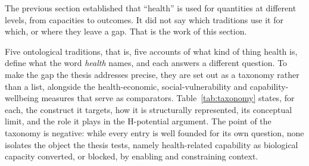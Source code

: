 The previous section established that ``health'' is used for quantities at different levels, from capacities to outcomes. It did not say which traditions use it for which, or where they leave a gap. That is the work of this section.

Five ontological traditions, that is, five accounts of what kind of thing health is, define what the word \emph{health} names, and each answers
a different question. To make the gap the thesis addresses precise, they are set out as
a taxonomy rather than a list, alongside the health-economic, social-vulnerability and
capability-wellbeing measures that serve as comparators. Table~\ref{tab:taxonomy}
states, for each, the construct it targets, how it is structurally represented, its
conceptual limit, and the role it plays in the H-potential argument. The point of the
taxonomy is negative: while every entry is well founded for its own question, none
isolates the object the thesis tests, namely health-related capability as biological
capacity converted, or blocked, by enabling and constraining context.

